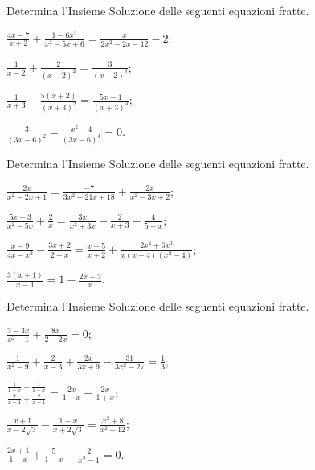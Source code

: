 \begin{esercizio}[\Ast]
 \label{ese:3.45}
Determina l'Insieme Soluzione delle seguenti equazioni fratte.
\begin{multicols}{2}
\begin{enumeratea}
\item $\frac{4 x-7}{x + 2} + \frac{1-6 x^{2}}{x^{2}-5 x + 6} =\frac{x}{2 x^{2}-2 x-12}-2$;
\item $\frac{1}{x-2} + \frac{2}{(x-2)^{2}} = \frac{3}{(x-2)^{3}}$;
\item $\frac{1}{x + 3}-\frac{5 (x + 2)}{(x + 3)^{2}} = \frac{5 x- 1}{(x + 3)^{3}}$;
\item $\frac{3}{(3 x-6)^{2}}-\frac{x^{2}-4}{(3 x-6)^{4}} = 0$.
\end{enumeratea}
\end{multicols}
\end{esercizio}

\begin{esercizio}[\Ast]
 \label{ese:3.46}
Determina l'Insieme Soluzione delle seguenti equazioni fratte.
\begin{multicols}{2}
\begin{enumeratea}
\item $\frac{2 x}{x^{2}-2 x + 1} = \frac{- 7}{3 x^{2}-21 x + 18}+ \frac{2 x}{x^{2}-3 x + 2}$;
\item $\frac{5 x-3}{x^{2}-5 x} + \frac{2}{x} = \frac{3 x}{x^{2}+ 3 x}-\frac{2}{x + 3}-\frac{4}{5-x}$;
\item $\frac{x-9}{4 x-x^{2}}-\frac{3 x + 2}{2-x} = \frac{x-5}{x + 2} + \frac{2 x^{4} + 6 x^{3}}{x (x-4) (x^{2}-4)}$;
\item $\frac{3 (x + 1)}{x-1}=1-\frac{2 x-3}{x}$.
\end{enumeratea}
\end{multicols}
\end{esercizio}
\pagebreak
\begin{esercizio}[\Ast]
 \label{ese:3.47}
Determina l'Insieme Soluzione delle seguenti equazioni fratte.
\begin{multicols}{2}
\begin{enumeratea}
\item $\frac{3-3 x}{x^{2}-1} + \frac{8 x}{2-2 x} = 0$;
\item $\frac{1}{x^{2}-9} + \frac{2}{x-3} + \frac{2 x}{3 x + 9} -\frac{31}{3 x^{2}-27} = \frac{1}{3}$;
\item $\frac{\frac{1}{1 + x}-\frac{1}{1-x}}{\frac{2}{x-1} +\frac{2}{x + 1}} = \frac{2 x}{1-x}-\frac{2 x}{1 + x}$;
\item $\frac{x + 1}{x-2 \sqrt{3}}-\frac{1-x}{x + 2 \sqrt{3}} =\frac{x^{2} + 8}{x^{2}-12}$;
\item $\frac{2 x + 1}{1 + x} + \frac{5}{1-x}-\frac{2}{x^{2}-1}= 0$.
\end{enumeratea}
\end{multicols}
\end{esercizio}

